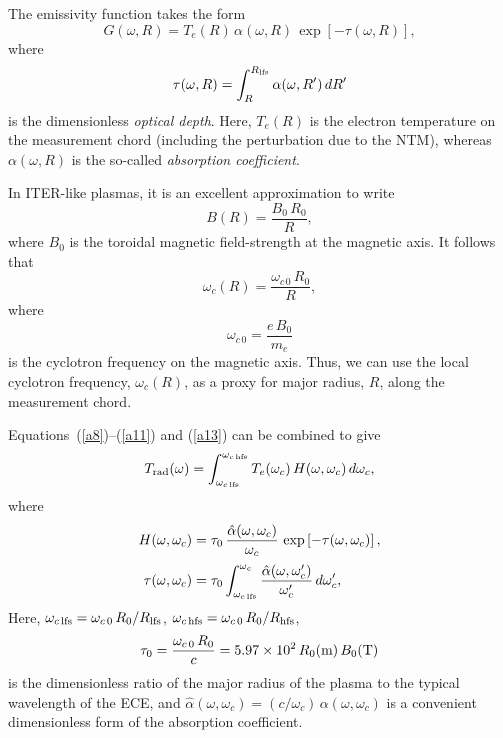 \documentclass[12pt,prb,aps]{revtex4-1}
\begin{document}
The emissivity function takes the form\,\cite{bornatici}
\begin{equation}\label{a10}
G(\omega, R) = T_e(R)\,\alpha(\omega,R)\,\exp\left[-\tau(\omega,R)\right],
\end{equation}
where 
\begin{equation}\label{a11}
\tau(\omega,R) = \int_R^{R_{\rm lfs}}\alpha(\omega,R')\,dR'
\end{equation}
is the dimensionless {\em optical depth}. 
Here, $T_e(R)$ is the electron temperature on the measurement chord (including the perturbation due to the NTM), whereas $\alpha(\omega,R)$
is the so-called {\em absorption coefficient}.

In ITER-like plasmas, it is an excellent approximation to write
\begin{equation}
B(R) = \frac{B_0\,R_0}{R},
\end{equation}
where $B_0$ is the toroidal magnetic field-strength at the magnetic axis.  It follows that
\begin{equation}\label{a13}
\omega_c(R) = \frac{\omega_{c\,0}\,R_0}{R},
\end{equation}
where
\begin{equation}
\omega_{c\,0} = \frac{e\,B_0}{m_e}
\end{equation}
is the cyclotron frequency on the magnetic axis. Thus, we can use the local cyclotron frequency, $\omega_c(R)$, as a proxy for major radius, $R$,  along the measurement chord. 

Equations~(\ref{a8})--(\ref{a11}) and (\ref{a13}) can be combined to give
\begin{equation}\label{a15}
T_{\rm rad}(\omega) = \int_{\omega_{c\,{\rm lfs}}}^{\omega_{c\,{\rm hfs}}}T_e(\omega_c)\,H(\omega,\omega_c)\,d\omega_c,
\end{equation}
where
\begin{align}
H(\omega,\omega_c)&=\tau_0\,\frac{\hat{\alpha}(\omega,\omega_c)}{\omega_c}\,\exp\left[-\tau(\omega,\omega_c)\right],\\[0.5ex]
\tau(\omega,\omega_c)&= \tau_0\int_{\omega_{c\,{\rm lfs}}}^{\omega_c}\frac{\hat{\alpha}(\omega,\omega_c')}{\omega_c'}\,d\omega_c',
\end{align}
Here, $\omega_{c\,{\rm lfs}}= \omega_{c\,0}\,R_0/R_{\rm lfs}$,  $\omega_{c\,{\rm hfs}}= \omega_{c\,0}\,R_0/R_{\rm hfs}$, 
\begin{equation}
\tau_0 = \frac{\omega_{c\,0}\,R_0}{c}= 5.97\times 10^2\,R_0({\rm m})\,B_0({\rm T})
\end{equation}
is the dimensionless  ratio of the major radius of the plasma to the typical wavelength of the ECE, and $\hat{\alpha}(\omega,\omega_c) = (c/\omega_c)\,\alpha(\omega,\omega_c)$
is a convenient dimensionless form of the absorption coefficient. 
\end{document}
